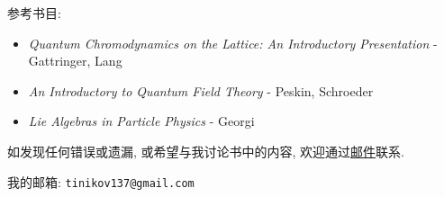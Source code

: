 
\begin{spacing}{1.8}
  参考书目: 
  \begin{itemize}
    \item \textit{Quantum Chromodynamics on the Lattice: An Introductory Presentation} - Gattringer, Lang
    \item \textit{An Introductory to Quantum Field Theory} - Peskin, Schroeder
    \item \textit{Lie Algebras in Particle Physics} - Georgi
  \end{itemize}

  如发现任何错误或遗漏, 或希望与我讨论书中的内容, 欢迎通过\href{mailto:tinikov137@gmail.com}{邮件}联系.

  我的邮箱: \texttt{tinikov137@gmail.com}
\end{spacing}
\pagestyle{general}